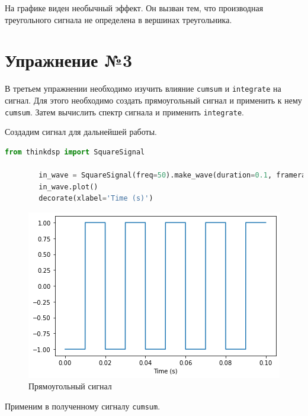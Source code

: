 \documentclass[a4paper, 14pt]{extarticle}
\begin{document}
    На графике виден необычный эффект. Он вызван тем, что производная треугольного сигнала не определена в вершинах треугольника.

    \newpage


    \section{Упражнение №3}
    \label{sec:3}

    В третьем упражнении необходимо изучить влияние \texttt{cumsum} и \texttt{integrate} на сигнал.
    Для этого необходимо создать прямоугольный сигнал и применить к нему \texttt{cumsum}.
    Затем вычислить спектр сигнала и применить \texttt{integrate}.

    Создадим сигнал для дальнейшей работы.

    \begin{lstlisting}[language=Python, caption= Создание прямоугольного сигнала, label={lst:make_square_signal}]
        from thinkdsp import SquareSignal

        in_wave = SquareSignal(freq=50).make_wave(duration=0.1, framerate=44100)
        in_wave.plot()
        decorate(xlabel='Time (s)')
    \end{lstlisting}

    \begin{figure}[H]
        \centering
        \includegraphics[width=0.8\linewidth]{square_signal}
        \caption{Прямоугольный сигнал}
        \label{fig:square_signal}
    \end{figure}

    Применим в полученному сигналу \texttt{cumsum}.
\end{document}
